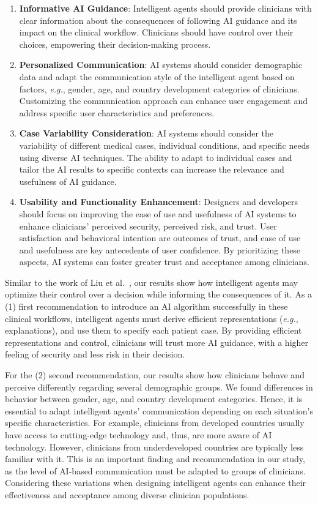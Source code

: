 \begin{enumerate}
\item {\bf Informative \ac{AI} Guidance}: Intelligent agents should provide clinicians with clear information about the consequences of following \ac{AI} guidance and its impact on the clinical workflow. Clinicians should have control over their choices, empowering their decision-making process.
\item {\bf Personalized Communication}: \ac{AI} systems should consider demographic data and adapt the communication style of the intelligent agent based on factors, {\it e.g.}, gender, age, and country development categories of clinicians. Customizing the communication approach can enhance user engagement and address specific user characteristics and preferences.
\item {\bf Case Variability Consideration}: \ac{AI} systems should consider the variability of different medical cases, individual conditions, and specific needs using diverse AI techniques. The ability to adapt to individual cases and tailor the \ac{AI} results to specific contexts can increase the relevance and usefulness of \ac{AI} guidance.
\item {\bf Usability and Functionality Enhancement}: Designers and developers should focus on improving the ease of use and usefulness of \ac{AI} systems to enhance clinicians' perceived security, perceived risk, and trust. User satisfaction and behavioral intention are outcomes of trust, and ease of use and usefulness are key antecedents of user confidence. By prioritizing these aspects, \ac{AI} systems can foster greater trust and acceptance among clinicians.
\end{enumerate}

Similar to the work of Liu et al.~\cite{LIU2022107026}, our results show how intelligent agents may optimize their control over a decision while informing the consequences of it.
As a (1) first recommendation to introduce an \ac{AI} algorithm successfully in these clinical workflows, intelligent agents must derive efficient representations ({\it e.g.}, explanations), and use them to specify each patient case.
By providing efficient representations and control, clinicians will trust more \ac{AI} guidance, with a higher feeling of security and less risk in their decision.

For the (2) second recommendation, our results show how clinicians behave and perceive differently regarding several demographic groups.
We found differences in behavior between gender, age, and country development categories.
Hence, it is essential to adapt intelligent agents' communication depending on each situation's specific characteristics.
For example, clinicians from developed countries usually have access to cutting-edge technology and, thus, are more aware of \ac{AI} technology. However, clinicians from underdeveloped countries are typically less familiar with it.
This is an important finding and recommendation in our study, as the level of \ac{AI}-based communication must be adapted to groups of clinicians.
Considering these variations when designing intelligent agents can enhance their effectiveness and acceptance among diverse clinician populations.


